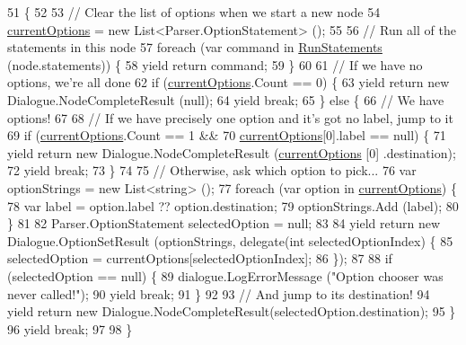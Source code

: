 \begin{DoxyCode}
51         \{
52 
53             \textcolor{comment}{// Clear the list of options when we start a new node}
54             \hyperlink{a00097_a1ff25426f4da4236acc741bbbb8c0d56}{currentOptions} = \textcolor{keyword}{new} List<Parser.OptionStatement> ();
55 
56             \textcolor{comment}{// Run all of the statements in this node}
57             \textcolor{keywordflow}{foreach} (var command \textcolor{keywordflow}{in} \hyperlink{a00097_aa436557ec45c8e98d194d9af139d9170}{RunStatements} (node.statements)) \{
58                 yield \textcolor{keywordflow}{return} command;
59             \}
60 
61             \textcolor{comment}{// If we have no options, we're all done}
62             \textcolor{keywordflow}{if} (\hyperlink{a00097_a1ff25426f4da4236acc741bbbb8c0d56}{currentOptions}.Count == 0) \{
63                 yield \textcolor{keywordflow}{return} \textcolor{keyword}{new} Dialogue.NodeCompleteResult (null);
64                 yield \textcolor{keywordflow}{break};
65             \} \textcolor{keywordflow}{else} \{
66                 \textcolor{comment}{// We have options!}
67 
68                 \textcolor{comment}{// If we have precisely one option and it's got no label, jump to it}
69                 \textcolor{keywordflow}{if} (\hyperlink{a00097_a1ff25426f4da4236acc741bbbb8c0d56}{currentOptions}.Count == 1 &&
70                     \hyperlink{a00097_a1ff25426f4da4236acc741bbbb8c0d56}{currentOptions}[0].label == null) \{
71                     yield \textcolor{keywordflow}{return} \textcolor{keyword}{new} Dialogue.NodeCompleteResult (\hyperlink{a00097_a1ff25426f4da4236acc741bbbb8c0d56}{currentOptions} [0]
      .destination);
72                     yield \textcolor{keywordflow}{break};
73                 \}
74 
75                 \textcolor{comment}{// Otherwise, ask which option to pick...}
76                 var optionStrings = \textcolor{keyword}{new} List<string> ();
77                 \textcolor{keywordflow}{foreach} (var option \textcolor{keywordflow}{in} \hyperlink{a00097_a1ff25426f4da4236acc741bbbb8c0d56}{currentOptions}) \{
78                     var label = option.label ?? option.destination;
79                     optionStrings.Add (label);
80                 \}
81 
82                 Parser.OptionStatement selectedOption = null;
83 
84                 yield \textcolor{keywordflow}{return} \textcolor{keyword}{new} Dialogue.OptionSetResult (optionStrings, delegate(\textcolor{keywordtype}{int} selectedOptionIndex)
       \{
85                     selectedOption = currentOptions[selectedOptionIndex];
86                 \});
87 
88                 \textcolor{keywordflow}{if} (selectedOption == null) \{
89                     dialogue.LogErrorMessage (\textcolor{stringliteral}{"Option chooser was never called!"});
90                     yield \textcolor{keywordflow}{break};
91                 \}
92 
93                 \textcolor{comment}{// And jump to its destination!}
94                 yield \textcolor{keywordflow}{return} \textcolor{keyword}{new} Dialogue.NodeCompleteResult(selectedOption.destination);
95             \}
96             yield \textcolor{keywordflow}{break};
97 
98         \}
\end{DoxyCode}
